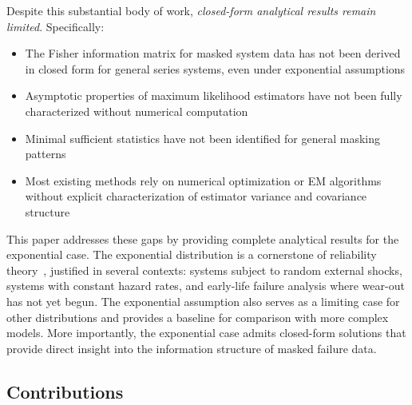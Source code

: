 \documentclass[12pt]{article}
\theoremstyle{definition}
\theoremstyle{remark}
\begin{document}
Despite this substantial body of work, \emph{closed-form analytical results remain limited}. Specifically:
\begin{itemize}
\item The Fisher information matrix for masked system data has not been derived in closed form for general series systems, even under exponential assumptions
\item Asymptotic properties of maximum likelihood estimators have not been fully characterized without numerical computation
\item Minimal sufficient statistics have not been identified for general masking patterns
\item Most existing methods rely on numerical optimization or EM algorithms without explicit characterization of estimator variance and covariance structure
\end{itemize}

This paper addresses these gaps by providing complete analytical results for the exponential case. The exponential distribution is a cornerstone of reliability theory~\cite{barlow1975}, justified in several contexts: systems subject to random external shocks, systems with constant hazard rates, and early-life failure analysis where wear-out has not yet begun. The exponential assumption also serves as a limiting case for other distributions and provides a baseline for comparison with more complex models. More importantly, the exponential case admits closed-form solutions that provide direct insight into the information structure of masked failure data.

\subsection{Contributions}
\end{document}
